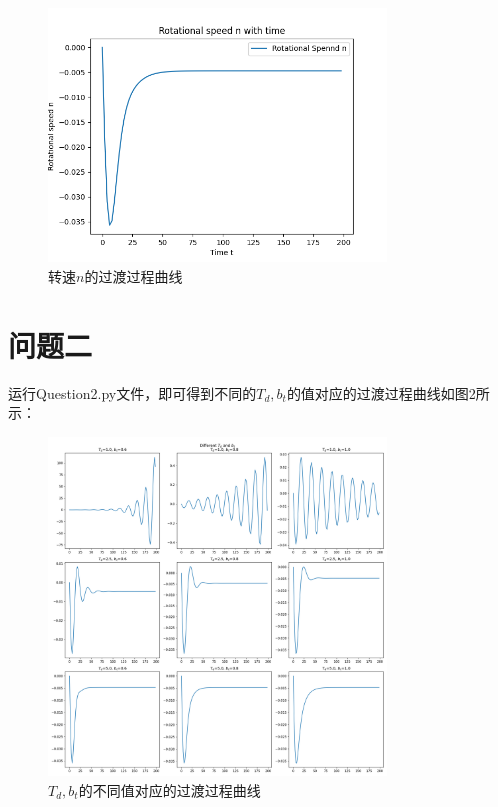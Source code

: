 \documentclass[UTF8]{ctexart}
\begin{document}
\begin{figure}[htbp]
    \centering
    \includegraphics[width=0.8\textwidth]{pic/n-t.png}
    \caption{转速$n$的过渡过程曲线}
\end{figure}

\section{问题二}

运行Question2.py文件，即可得到不同的$T_d,b_t$的值对应的过渡过程曲线如图2所示：

\begin{figure}[htbp]
    \centering
    \includegraphics[width=0.8\textwidth]{pic/dif_td_bt.png}
    \caption{$T_d,b_t$的不同值对应的过渡过程曲线}
\end{figure}
\end{document}
